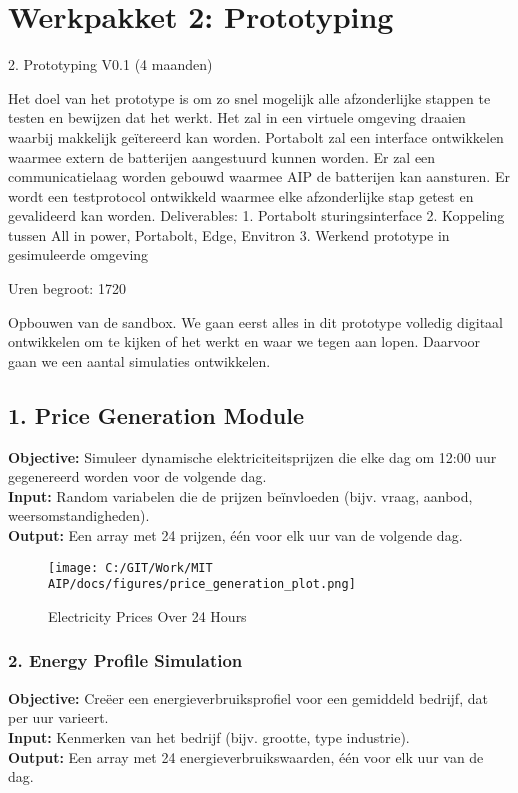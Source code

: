 \section{Werkpakket 2: Prototyping}
2. Prototyping V0.1 (4 maanden) 

Het doel van het prototype is om zo snel mogelijk alle afzonderlijke stappen te testen en bewijzen dat het werkt. Het zal in een virtuele omgeving draaien waarbij makkelijk geïtereerd kan worden. Portabolt zal een interface ontwikkelen waarmee extern de batterijen aangestuurd kunnen worden. Er zal een communicatielaag worden gebouwd waarmee AIP de batterijen kan aansturen. Er wordt een testprotocol ontwikkeld waarmee elke afzonderlijke stap getest en gevalideerd kan worden. 
Deliverables: 
1. Portabolt sturingsinterface 
2. Koppeling tussen All in power, Portabolt, Edge, Envitron 
3. Werkend prototype in gesimuleerde omgeving 

Uren begroot: 1720

Opbouwen van de sandbox. We gaan eerst alles in dit prototype volledig digitaal ontwikkelen om te kijken of het werkt en waar we tegen aan lopen. Daarvoor gaan we een aantal simulaties ontwikkelen. 

\usepackage{placeins}  %

\subsection{1. Price Generation Module}
\textbf{Objective:} Simuleer dynamische elektriciteitsprijzen die elke dag om 12:00 uur gegenereerd worden voor de volgende dag. \\
\textbf{Input:} Random variabelen die de prijzen beïnvloeden (bijv. vraag, aanbod, weersomstandigheden). \\
\textbf{Output:} Een array met 24 prijzen, één voor elk uur van de volgende dag.

\begin{figure}[h!]
  \centering
  \texttt{[image: C:/GIT/Work/MIT AIP/docs/figures/price\_generation\_plot.png]}
  \caption{Electricity Prices Over 24 Hours}
  \label{fig:price_plot}
\end{figure}

\FloatBarrier  %

\subsubsection{2. Energy Profile Simulation}
\textbf{Objective:} Creëer een energieverbruiksprofiel voor een gemiddeld bedrijf, dat per uur varieert. \\
\textbf{Input:} Kenmerken van het bedrijf (bijv. grootte, type industrie). \\
\textbf{Output:} Een array met 24 energieverbruikswaarden, één voor elk uur van de dag.

